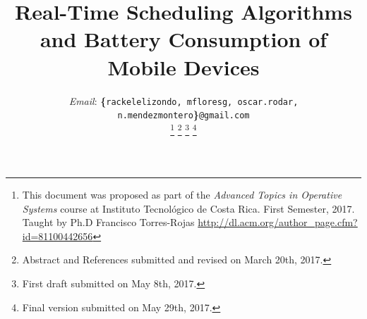 \documentclass[10pt,article]{IEEEtran}
\begin{document}
%
\title{Real-Time Scheduling Algorithms and Battery Consumption of Mobile Devices}
%
%
%
%


\author{
\vspace{0.1cm}
\small{\emph{Email}: \textbf{\{}\texttt{rackelelizondo, mfloresg, oscar.rodar, n.mendezmontero}\textbf{\}}\texttt{@gmail.com}}

\thanks{This document was proposed as part of the \emph{Advanced Topics in Operative Systems} course at Instituto Tecnológico de Costa Rica. First Semester, 2017. Taught by Ph.D Francisco Torres-Rojas \url{http://dl.acm.org/author_page.cfm?id=81100442656}} 
\thanks{Abstract and References submitted and revised on March 20th, 2017.}
\thanks{First draft submitted on May 8th, 2017.}
\thanks{Final version submitted on May 29th, 2017.}
}
\end{document}

